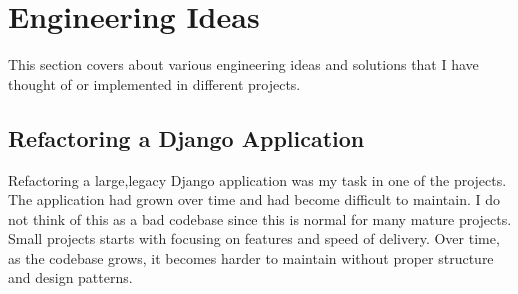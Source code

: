 \section{Engineering Ideas}
This section covers about various engineering ideas and solutions that I have thought of or implemented in different projects.

\subsection{Refactoring a Django Application}
Refactoring a large,legacy Django application was my task in one of the projects. The application had grown over time and had become difficult to maintain. I do not think of this as a bad codebase since this is normal for many mature projects. Small projects starts with focusing on features and speed of delivery. Over time, as the codebase grows, it becomes harder to maintain without proper structure and design patterns.